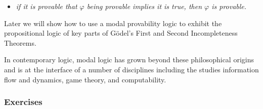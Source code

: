 \documentclass[
  12pt,
  letterpaper,
  DIV=11,
  numbers=noendperiod,
  twoside]{scrreprt}
\providecommand{\tightlist}{%
  \setlength{\itemsep}{0pt}\setlength{\parskip}{0pt}}\usepackage{longtable,booktabs,array}
\let\labelitemito\labelitemi
\theoremstyle{remark}
\begin{document}
\begin{itemize}
\tightlist
\item
  \emph{if it is provable that \(\varphi\) being provable implies it is
  true, then \(\varphi\) is provable.}
\end{itemize}

\renewcommand\labelitemi{\labelitemito}

Later we will show how to use a modal provability logic to exhibit the
propositional logic of key parts of Gödel's First and Second
Incompleteness Theorems.

In contemporary logic, modal logic has grown beyond these philosophical
origins and is at the interface of a number of disciplines including the
studies information flow and dynamics, game theory, and computability.

\subsubsection*{Exercises}\label{exercises}
\end{document}
